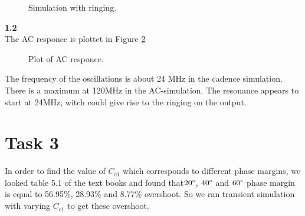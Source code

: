 \documentclass[a4paper,english,11pt]{article}
\begin{document}
\begin{figure}[!htbp]
 \centering
  \caption{Simulation with ringing.}
  \label{fig:sim:ring}	
\end{figure}
\newpage
\textbf{1.2}\\
The AC responce is plottet in Figure \ref{fig:ac:responce}\\
\begin{figure}[!htbp]
 \centering
  \caption{Plot of AC responce.}
  \label{fig:ac:responce}	
\end{figure}

The frequency of the oscillations is about 24 MHz in the cadence simulation. There is a maximum at 120MHz in the AC-simulation. The   resonance appears to start at 24MHz, witch could give rise to the ringing on the output. 

\section{Task 3}
In order to find the value of $C_{c1}$ which corresponds to different phase margins, we looked table 5.1 of the text books and found that$ 20\degree$, $40\degree$ and $60\degree$  phase margin is equal to 56.95\%, 28.93\% and 8.77\% overshoot. So we ran transient simulation with varying  $C_{c1}$ to get these overshoot.\\
\end{document}
